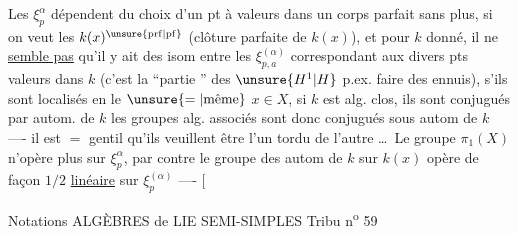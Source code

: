 Les $\xi_p^\alpha$ dépendent du choix d'un  pt  à valeurs dans un corps parfait sans plus, si on veut les $k(x)^{\unsure{\mathrm{prf}|\mathrm{pf}}}$\deleted{\unsure{,}} (clôture parfaite de $k(x)$), et pour $k$ donné, il ne \uline{semble pas} qu'il y ait  des isom entre les $\xi_{p,a}^{(\alpha)}$ correspondant aux divers pts  valeurs dans $k$ (c'est la ``partie '' des $\unsure{H^1|H}$ p.ex.  faire des ennuis), s'ils sont localisés en le $\unsure{=|\text{même}}$ $x\in X$,   si $k$ est alg. clos, ils sont conjugués par autom. de $k$  les groupes alg. associés sont donc conjugués sous autom de $k$ ---- il est $=$ gentil qu'ils veuillent être l'un tordu de l'autre \ldots\ Le groupe $\pi_1(X)$ n'opère plus sur $\xi_p^\alpha$,
par contre le groupe des autom de $k$ sur $k(x)$ \deleted{\unsure{[ou = de $k$|[ou = de $k$,}}
\deleted{\unsure{il existe]}} opère de façon $1/2$ \uline{linéaire} sur $\xi_p^{(\alpha)}$ ---- [  

Notations
ALGÈBRES de LIE SEMI-SIMPLES \hfill Tribu n\textsuperscript{o} 59

